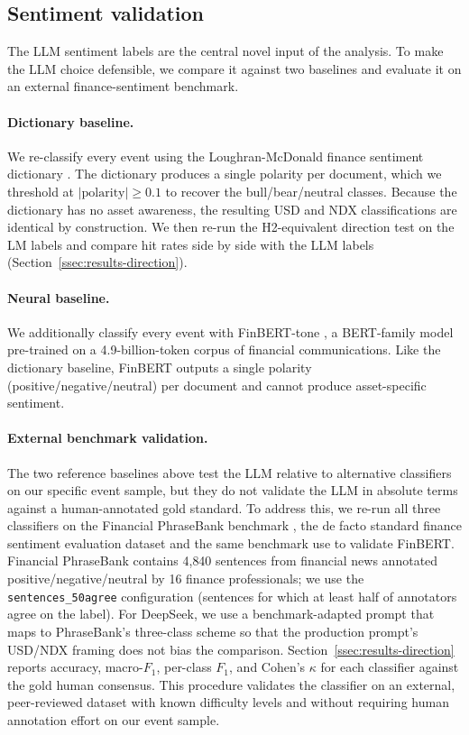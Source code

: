\subsection{Sentiment validation}
\label{ssec:sentiment-validation}

The LLM sentiment labels are the central novel input of the
analysis. To make the LLM choice defensible, we compare it against
two baselines and evaluate it on an external finance-sentiment
benchmark.

\paragraph{Dictionary baseline.} We re-classify every event using
the Loughran-McDonald finance sentiment dictionary
\citep{loughran2011liability}. The dictionary produces a single
polarity per document, which we threshold at
$|\text{polarity}| \geq 0.1$ to recover the bull/bear/neutral
classes. Because the dictionary has no asset awareness, the
resulting USD and NDX classifications are identical by construction.
We then re-run the H2-equivalent direction test on the LM labels
and compare hit rates side by side with the LLM labels
(Section~\ref{ssec:results-direction}).

\paragraph{Neural baseline.} We additionally classify every event
with FinBERT-tone \citep{yang2020finbert}, a BERT-family model
pre-trained on a 4.9-billion-token corpus of financial
communications. Like the dictionary baseline, FinBERT outputs a
single polarity (positive/negative/neutral) per document and cannot
produce asset-specific sentiment.

\paragraph{External benchmark validation.} The two reference
baselines above test the LLM relative to alternative classifiers on
our specific event sample, but they do not validate the LLM in
absolute terms against a human-annotated gold standard. To address
this, we re-run all three classifiers on the Financial PhraseBank
benchmark \citep{malo2014good}, the de facto standard finance
sentiment evaluation dataset and the same benchmark
\citet{yang2020finbert} use to validate FinBERT. Financial
PhraseBank contains 4{,}840 sentences from financial news annotated
positive/negative/neutral by 16 finance professionals; we use the
\texttt{sentences\_50agree} configuration (sentences for which at
least half of annotators agree on the label). For DeepSeek, we use a
benchmark-adapted prompt that maps to PhraseBank's three-class
scheme so that the production prompt's USD/NDX framing does not
bias the comparison. Section~\ref{ssec:results-direction} reports
accuracy, macro-$F_1$, per-class $F_1$, and Cohen's $\kappa$ for
each classifier against the gold human consensus. This procedure
validates the classifier on an external, peer-reviewed dataset with
known difficulty levels and without requiring human annotation
effort on our event sample.

